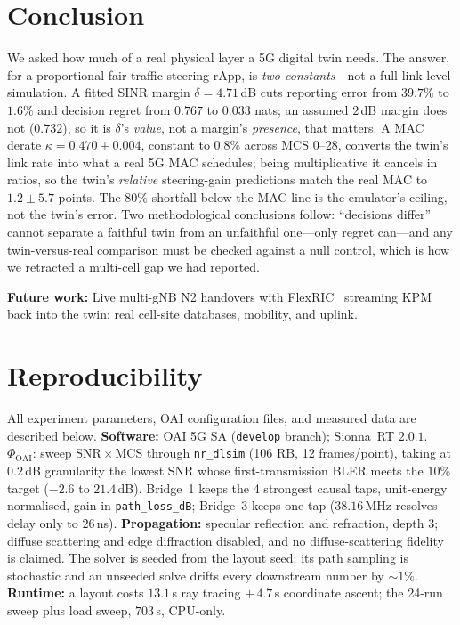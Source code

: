 \documentclass[conference]{IEEEtran}
\begin{document}
\section{Conclusion}
We asked how much of a real physical layer a 5G digital twin needs. The answer, for a proportional-fair traffic-steering rApp, is \emph{two constants}---not a full link-level simulation. A fitted SINR margin $\delta{=}4.71$\,dB cuts reporting error from $39.7\%$ to $1.6\%$ and decision regret from $0.767$ to $0.033$ nats; an assumed $2$\,dB margin does not ($0.732$), so it is $\delta$'s \emph{value}, not a margin's \emph{presence}, that matters. A MAC derate $\kappa{=}0.470\pm0.004$, constant to $0.8\%$ across MCS 0--28, converts the twin's link rate into what a real 5G MAC schedules; being multiplicative it cancels in ratios, so the twin's \emph{relative} steering-gain predictions match the real MAC to $1.2\pm5.7$ points. The $80\%$ shortfall below the MAC line is the emulator's ceiling, not the twin's error. Two methodological conclusions follow: ``decisions differ'' cannot separate a faithful twin from an unfaithful one---only regret can---and any twin-versus-real comparison must be checked against a null control, which is how we retracted a multi-cell gap we had reported.

\textbf{Future work:} Live multi-gNB N2 handovers with FlexRIC~\cite{flexric} streaming KPM back into the twin; real cell-site databases, mobility, and uplink.

\section*{Reproducibility}
All experiment parameters, OAI configuration files, and measured data are described below. \textbf{Software:} OAI 5G SA (\texttt{develop} branch); Sionna~RT $2.0.1$. $\Phi_{\mathrm{OAI}}$: sweep SNR\,$\times$\,MCS through \texttt{nr\_dlsim} (106 RB, 12 frames/point), taking at $0.2$\,dB granularity the lowest SNR whose first-transmission BLER meets the $10\%$ target ($-2.6$ to $21.4$\,dB). Bridge~1 keeps the 4 strongest causal taps, unit-energy normalised, gain in \texttt{path\_loss\_dB}; Bridge~3 keeps one tap ($38.16$\,MHz resolves delay only to $26$\,ns). \textbf{Propagation:} specular reflection and refraction, depth 3; diffuse scattering and edge diffraction disabled, and no diffuse-scattering fidelity is claimed. The solver is seeded from the layout seed: its path sampling is stochastic and an unseeded solve drifts every downstream number by ${\sim}1\%$. \textbf{Runtime:} a layout costs $13.1$\,s ray tracing $+\,4.7$\,s coordinate ascent; the 24-run sweep plus load sweep, $703$\,s, CPU-only.

\balance
\def\IEEEbibitemsep{0pt plus .5pt}


\end{document}
